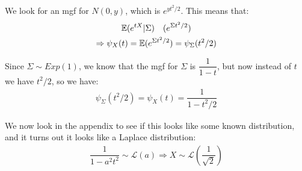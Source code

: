 \noindent We look for an mgf for $N(0,y)$, which is $e^{yt^2/2}$. This means that:
\begin{equation*}
  \begin{gathered}
    \mathbb{E}(e^{tX}|\Sigma)\quad (e^{\Sigma t^2/2})\\
    \Rightarrow \psi_X(t) = \mathbb{E}(e^{\Sigma t^2/2}) = \psi_\Sigma(t^2/2)
  \end{gathered}
\end{equation*}\par
\noindent Since $\Sigma\sim Exp(1)$, we know that the mgf for $\Sigma$ is $\dfrac{1}{1-t}$, but now instead of $t$ we have $t^2/2$, so we have:
\begin{equation*}
  \begin{gathered}
    \psi_\Sigma(t^2/2) = \psi_X(t) = \dfrac{1}{1-t^2/2}
  \end{gathered}
\end{equation*}\par
\noindent We now look in the appendix to see if this looks like some known distribution, and it turns out it looks like a Laplace distribution:
\begin{equation*}
  \begin{gathered}
    \dfrac{1}{1-a^2t^2}\sim \mathcal{L}(a)\Rightarrow X\sim \mathcal{L}\left(\dfrac{1}{\sqrt{2}}\right)
  \end{gathered}
\end{equation*}
\par\bigskip
